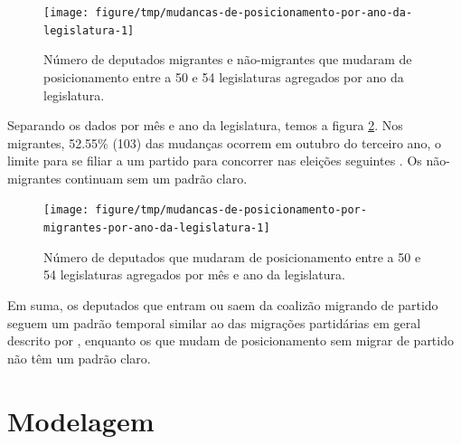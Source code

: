\documentclass[a4paper,titlepage]{ppgi}\usepackage[]{graphicx}\usepackage[]{color}
\newenvironment{knitrout}{}{} %
\begin{document}
\begin{knitrout}
\color{fgcolor}\begin{figure}
\texttt{[image: figure/tmp/mudancas-de-posicionamento-por-ano-da-legislatura-1]} \caption[Número de deputados migrantes e não-migrantes que mudaram de posicionamento entre a 50\textordfeminine{} e 54\textordfeminine{} legislaturas agregados por ano da legislatura]{Número de deputados migrantes e não-migrantes que mudaram de posicionamento entre a 50\textordfeminine{} e 54\textordfeminine{} legislaturas agregados por ano da legislatura.}\label{fig:mudancas-de-posicionamento-por-ano-da-legislatura}
\end{figure}


\end{knitrout}

Separando os dados por mês e ano da legislatura, temos a figura
\ref{fig:mudancas-de-posicionamento-por-migrantes-por-ano-da-legislatura}. Nos
migrantes,
52.55\%
(103) das mudanças ocorrem
em outubro do terceiro ano, o limite para se filiar a um partido para concorrer
nas eleições seguintes \cite{Lei9504/1997}. Os não-migrantes continuam sem um
padrão claro.

\begin{knitrout}
\color{fgcolor}\begin{figure}
\texttt{[image: figure/tmp/mudancas-de-posicionamento-por-migrantes-por-ano-da-legislatura-1]} \caption[Número de deputados que mudaram de posicionamento entre a 50\textordfeminine{} e 54\textordfeminine{} legislaturas agregados por mês e ano da legislatura]{Número de deputados que mudaram de posicionamento entre a 50\textordfeminine{} e 54\textordfeminine{} legislaturas agregados por mês e ano da legislatura.}\label{fig:mudancas-de-posicionamento-por-migrantes-por-ano-da-legislatura}
\end{figure}


\end{knitrout}

Em suma, os deputados que entram ou saem da coalizão migrando de partido
seguem um padrão temporal similar ao das migrações partidárias em geral
descrito por , enquanto os que mudam de posicionamento
sem migrar de partido não têm um padrão claro.

\section{Modelagem}
\end{document}
